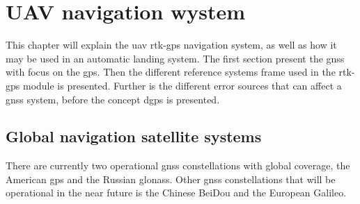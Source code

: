 
\chapter{UAV navigation wystem}
This chapter will explain the \gls{uav} \acrfull{rtk-gps} navigation system, as well as how it may be used in an automatic landing system. The first section present the \acrfull{gnss} with focus on the \acrfull{gps}. Then the different reference systems frame used in the \gls{rtk-gps} module is presented. Further is the different error sources that can affect a \gls{gnss} system, before the concept \acrfull{dgps} is presented.
%
%
%
%
%
%
%

\section{Global navigation satellite systems}
There are currently two operational \gls{gnss} constellations with global coverage, the American \gls{gps} and the Russian \gls{glonass}. Other \gls{gnss} constellations that will be operational in the near future is the Chinese BeiDou and the European Galileo.

